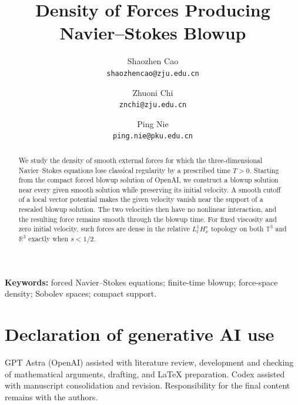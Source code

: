 \documentclass[11pt,a4paper]{article}
\title{Density of Forces Producing\\ Navier--Stokes Blowup}
\author{Shaozhen Cao\\\texttt{shaozhencao@zju.edu.cn}\and
Zhuoni Chi\\\texttt{znchi@zju.edu.cn}\and
Ping Nie\\\texttt{ping.nie@pku.edu.cn}}
\date{}
\theoremstyle{definition}\newtheorem{definition}[theorem]{Definition}
\theoremstyle{remark}\newtheorem{remark}[theorem]{Remark}
\newcommand{\R}{\mathbb R}\newcommand{\TT}{\mathbb T^3}
\begin{document}
\maketitle
\begin{abstract}
We study the density of smooth external forces for which the three-dimensional
Navier--Stokes equations lose classical regularity by a prescribed time $T>0$.
Starting from the compact forced blowup solution of OpenAI, we construct a
blowup solution near every given smooth solution while preserving its
initial velocity. A smooth cutoff of a local vector potential makes the
given velocity vanish near the support of a rescaled blowup solution.
The two velocities then have no nonlinear interaction, and the resulting
force remains smooth through the blowup time. For fixed viscosity and zero
initial velocity, such forces are dense in the relative $L^1_tH^s_x$ topology
on both $\TT$ and $\R^3$ exactly when $s<1/2$.
\end{abstract}
\noindent\textbf{Keywords:} forced Navier--Stokes equations; finite-time blowup;
force-space density; Sobolev spaces; compact support.





\section*{Declaration of generative AI use}
GPT Astra (OpenAI) assisted with literature review, development and checking
of mathematical arguments, drafting, and LaTeX preparation. Codex assisted
with manuscript consolidation and revision. Responsibility for the final
content remains with the authors.

\end{document}
